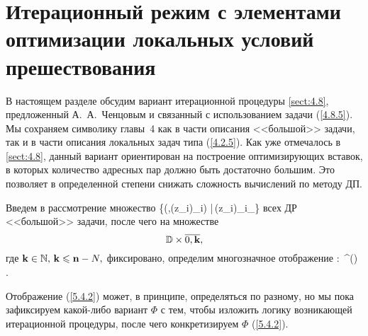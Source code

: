 
\section{
  Итерационный режим
  с элементами оптимизации
  локальных условий прешествования
}
\label{sect:5.4}
\setcounter{equation}{0}

В настоящем разделе обсудим вариант итерационной процедуры \ref{sect:4.8},
предложенный А.~А.~Ченцовым и связанный с использованием задачи (\ref{4.8.5}).
Мы сохраняем символику главы~4 как в части описания <<большой>> задачи,
так и в части описания локальных задач типа (\ref{4.2.5}).
Как уже отмечалось в \ref{sect:4.8},
данный вариант ориентирован на построение оптимизирующих вставок,
в которых количество адресных пар должно быть достаточно большим.
Это позволяет в определенной степени снижать сложность вычислений по методу ДП.

Введем в рассмотрение множество
\bfn
  \label{5.4.1}
  \bbd \df \bigl\{\bigl(\al,(z_i)_{i\in{}})\in \ca
  \times {}|\,(z_i)_{i\in{}}\in {}_\al\bigl\}
\efn
всех ДР <<большой>> задачи,
после чего на множестве
$$
  \bbd \times \ov{0,\mathbf{k}}
  ,
$$
где
$\mathbf{k}\in {\mathbb N},\,\mathbf{k}\leqslant {\mathbf n}-N,$
фиксировано,
определим многозначное отображение
\bfn
  \label{5.4.2}
  \Phi:\,\bbd\times {}\longrightarrow
  \cp^\prime()
  .
\efn

Отображение (\ref{5.4.2}) может, в принципе, определяться по разному,
но мы пока зафиксируем какой-либо вариант $\Phi$ с тем,
чтобы изложить логику возникающей итерационной процедуры,
после чего конкретизируем $\Phi$
(\ref{5.4.2}).

